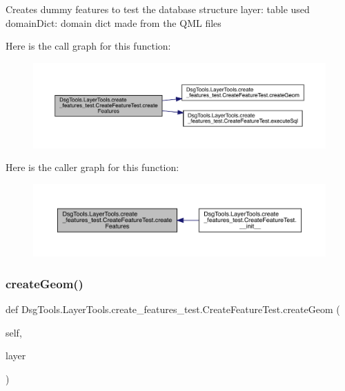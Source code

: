 \begin{DoxyVerb}Creates dummy features to test the database structure
layer: table used
domainDict: domain dict made from the QML files
\end{DoxyVerb}
 Here is the call graph for this function\+:
\nopagebreak
\begin{figure}[H]
\begin{center}
\leavevmode
\includegraphics[width=350pt]{class_dsg_tools_1_1_layer_tools_1_1create__features__test_1_1_create_feature_test_a4b7c74aa14ef03f705e97827e9943c64_cgraph}
\end{center}
\end{figure}
Here is the caller graph for this function\+:
\nopagebreak
\begin{figure}[H]
\begin{center}
\leavevmode
\includegraphics[width=350pt]{class_dsg_tools_1_1_layer_tools_1_1create__features__test_1_1_create_feature_test_a4b7c74aa14ef03f705e97827e9943c64_icgraph}
\end{center}
\end{figure}
\mbox{\label{class_dsg_tools_1_1_layer_tools_1_1create__features__test_1_1_create_feature_test_a4f0ff4286954932c222672f6f34ff96b}} 
\subsubsection{\texorpdfstring{create\+Geom()}{createGeom()}}
{\footnotesize\ttfamily def Dsg\+Tools.\+Layer\+Tools.\+create\+\_\+features\+\_\+test.\+Create\+Feature\+Test.\+create\+Geom (\begin{DoxyParamCaption}\item[{}]{self,  }\item[{}]{layer }\end{DoxyParamCaption})}

